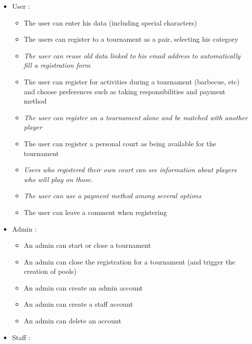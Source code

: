 \documentclass[a4paper, 12pt]{article}
\begin{document}
\begin{itemize}

	\item User : 
	
	\begin{itemize}
		\item The user can enter his data (including special characters) 
		\item The users can register to a tournament as a pair, selecting his category 
		\item \textit{The user can reuse old data linked to his email address to automatically fill a registration form}
		\item The user can register for activities during a tournament (barbecue, etc) and choose preferences such as taking responsibilities and payment method
		\item \textit{The user can register on a tournament alone and be matched with another player}
		\item The user can register a personal court as being available for the tournament
		\item \textit{Users who registered their own court can see information about players who will play on those.}
		\item \textit{The user can use a payment method among several options}
		\item The user can leave a comment when registering
	\end{itemize}

    \item Admin : 
    
    \begin{itemize}
    	\item An admin can start or close a tournament
    	\item An admin can close the registration for a tournament (and trigger the creation of pools)
    	\item An admin can create an admin account
		\item An admin can create a staff account
		\item An admin can delete an account

    \end{itemize}
    
    \item Staff : 
    

\end{itemize}
\end{document}
